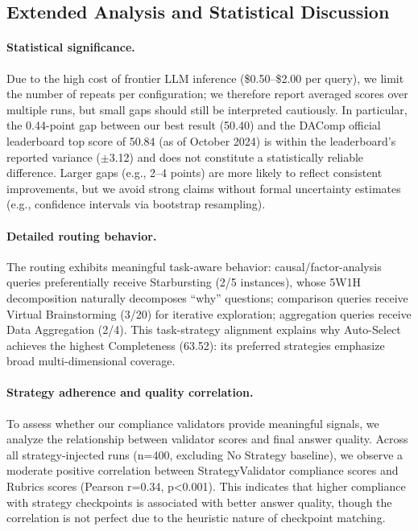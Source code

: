 \subsection{Extended Analysis and Statistical Discussion}
\label{app:analysis}

\paragraph{Statistical significance.}
Due to the high cost of frontier LLM inference (\$0.50--\$2.00 per query), we limit the number of repeats per configuration; we therefore report averaged scores over multiple runs, but small gaps should still be interpreted cautiously. In particular, the 0.44-point gap between our best result (50.40) and the DAComp official leaderboard top score of 50.84 (as of October 2024) is within the leaderboard's reported variance ($\pm$3.12) and does not constitute a statistically reliable difference. Larger gaps (e.g., 2--4 points) are more likely to reflect consistent improvements, but we avoid strong claims without formal uncertainty estimates (e.g., confidence intervals via bootstrap resampling).

\paragraph{Detailed routing behavior.}
The routing exhibits meaningful task-aware behavior: causal/factor-analysis queries preferentially receive Starbursting (2/5 instances), whose 5W1H decomposition naturally decomposes ``why'' questions; comparison queries receive Virtual Brainstorming (3/20) for iterative exploration; aggregation queries receive Data Aggregation (2/4). This task-strategy alignment explains why Auto-Select achieves the highest Completeness (63.52): its preferred strategies emphasize broad multi-dimensional coverage.

\paragraph{Strategy adherence and quality correlation.}
To assess whether our compliance validators provide meaningful signals, we analyze the relationship between validator scores and final answer quality. Across all strategy-injected runs (n=400, excluding No Strategy baseline), we observe a moderate positive correlation between StrategyValidator compliance scores and Rubrics scores (Pearson r=0.34, p<0.001). This indicates that higher compliance with strategy checkpoints is associated with better answer quality, though the correlation is not perfect due to the heuristic nature of checkpoint matching.

